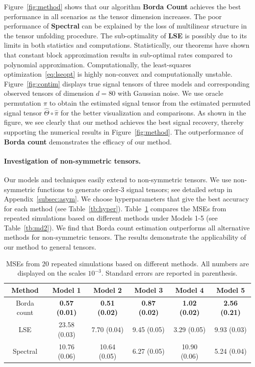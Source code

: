 \documentclass[12pt]{article}
\theoremstyle{definition}
\begin{document}
Figure~\ref{fig:method} shows that our algorithm {\bf \small Borda Count} achieves the best performance in all scenarios as the tensor dimension increases. The poor performance of {\bf \small Spectral} can be explained by the loss of multilinear structure in the tensor unfolding procedure. The sub-optimality of {\bf \small LSE} is possibly due to its limits in both statistics and computations. Statistically, our theorems have shown that constant block approximation results in sub-optimal rates compared to polynomial approximation. Computationally, the least-squares optimization~\eqref{eq:lseopt} is highly non-convex and computationally unstable. 
Figure~\ref{fig:contim} displays true signal tensors of three models and corresponding observed tensors of dimension $d = 80$ with Gaussian noise. We use oracle permutation $\pi$ to obtain the estimated signal tensor from the estimated permuted signal tensor $\hat\Theta\circ\hat\pi$ for the better visualization and comparisons. As shown in the figure, we see clearly that our method achieves the best signal recovery, thereby supporting the numerical results in Figure~\ref{fig:method}.
The outperformance of {\bf \small Borda count} demonstrates the efficacy of our method.


\paragraph{Investigation of non-symmetric tensors.}
Our models and techniques easily extend to non-symmetric tensors. We use non-symmetric functions to generate order-3 signal tensors; see detailed setup in Appendix~\ref{subsec:asym}. We choose hyperparameters that give the best accuracy for each method (see Table~\ref{tb:hyper}). Table~\ref{tb:asymresult} compares the MSEs from repeated simulations based on different methods under Models 1-5 (see Table~\ref{tb:md2}). We find that Borda count estimation outperforms all alternative methods for non-symmetric tensors. The results demonstrate the applicability of our method to general tensors. 

\begin{table}[ht]
    \centering
    \begin{tabular}{c|c|c|c|c|c}
        Method &  Model 1 & Model 2 & Model 3& Model 4 & Model 5  \\\hline
        Borda count &  {\bf 0.57 (0.01)}&{\bf 0.51 (0.02)}& {\bf0.87 (0.02)} &{\bf1.02 (0.02)}& {\bf2.56 (0.21)}\\
        LSE &23.58 (0.03)&7.70 (0.04)&9.45 (0.05)&3.29 (0.05)&9.93 (0.03)\\
        Spectral & 10.76 (0.06)&10.64 (0.05)&6.27 (0.05)&10.90 (0.06)&5.24 (0.04)
    \end{tabular}
    \caption{MSEs from 20 repeated simulations based on different methods. All numbers are displayed on the scales $10^{-3}$. Standard errors are reported in parenthesis.}
    \label{tb:asymresult}
\end{table}
\end{document}
